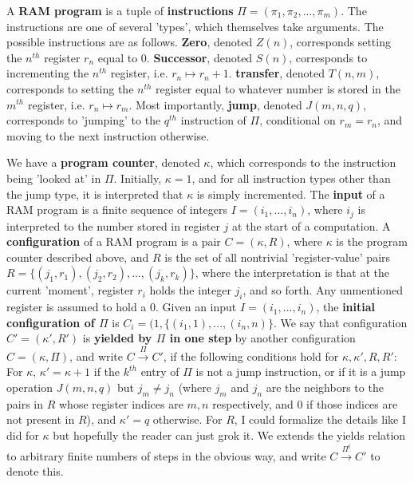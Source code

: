 \begin{definition}
	A \textbf{RAM program} is a tuple of \textbf{instructions} $\Pi = (\pi_1,\pi_2,...,\pi_m)$. The instructions are one of several 'types', which themselves take arguments. The possible instructions are as follows. \textbf{Zero}, denoted $Z(n)$, corresponds setting the $n^{th}$ register $r_n$ equal to $0$. \textbf{Successor}, denoted $S(n)$, corresponds to incrementing the $n^{th}$ register, i.e. $r_n \mapsto r_n+1$. \textbf{transfer}, denoted $T(n,m)$, corresponds to setting the $n^{th}$ register equal to whatever number is stored in the $m^{th}$ register, i.e. $r_n \mapsto r_m$. Most importantly, \textbf{jump}, denoted $J(m,n,q)$, corresponds to 'jumping' to the $q^{th}$ instruction of $\Pi$, conditional on $r_m = r_n$, and moving to the next instruction otherwise. 
	\par We have a \textbf{program counter}, denoted $\kappa$, which corresponds to the instruction being 'looked at' in $\Pi$. Initially, $\kappa = 1$, and for all instruction types other than the jump type, it is interpreted that $\kappa$ is simply incremented. The \textbf{input} of a RAM program is a finite sequence of integers $I = (i_1,...,i_n)$, where $i_j$ is interpreted to the number stored in register $j$ at the start of a computation. A \textbf{configuration} of a RAM program is a pair $C = (\kappa,R)$, where $\kappa$ is the program counter described above, and $R$ is the set of all nontrivial 'register-value' pairs $R = \{(j_1,r_1),(j_2,r_2),...,(j_k,r_k)\}$, where the interpretation is that at the current 'moment', register $r_i$ holds the integer $j_i$, and so forth. Any unmentioned register is assumed to hold a $0$. Given an input $I = (i_1,...,i_n)$, the \textbf{initial configuration of $\Pi$} is $C_i = (1,\{(i_1,1),...,(i_n,n)\}$. We say that configuration $C' = (\kappa',R')$ is \textbf{yielded by $\Pi$ in one step} by another configuration $C = (\kappa,\Pi)$, and write $C \overset{\Pi}{\to} C'$, if the following conditions hold for $\kappa,\kappa ',R,R'$: For $\kappa$, $\kappa ' = \kappa+1$ if the $k^{th}$ entry of $\Pi$ is not a jump instruction, or if it is a jump operation $J(m,n,q)$ but $j_m \neq j_n$ (where $j_m$ and $j_n$ are the neighbors to the pairs in $R$ whose register indices are $m,n$ respectively, and $0$ if those indices are not present in $R$), and $\kappa ' = q$ otherwise. For $R$, I could formalize the details like I did for $\kappa$ but hopefully the reader can just grok it. We extends the yields relation to arbitrary finite numbers of steps in the obvious way, and write $C \overset{\Pi^t}{\to} C'$ to denote this. 

\end{definition}

